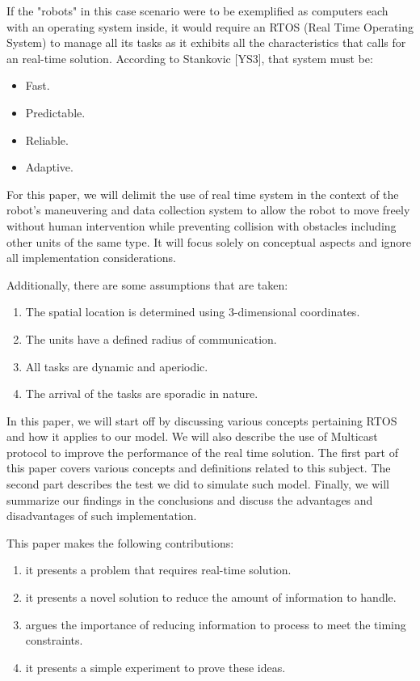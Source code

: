 \documentclass[journal]{IEEEtran}
\begin{document}
\begin{itemize}
If the "robots" in this case scenario were to be exemplified as computers each with an operating system inside, it would require an RTOS (Real Time Operating System) to manage all its tasks as it exhibits all the characteristics that calls for an real-time solution. According to Stankovic [YS3], that system must be:

\begin{itemize}
\item Fast.
\item Predictable.
\item Reliable.
\item Adaptive.
\end{itemize}

For this paper, we will delimit the use of real time system in the context of the robot's maneuvering and data collection system to allow the robot to move freely without human intervention while preventing collision with obstacles including other units of the same type. It will focus solely on conceptual aspects and ignore all implementation considerations. 

Additionally, there are some assumptions that are taken:

\begin{enumerate}
\item The spatial location is determined using 3-dimensional coordinates.
\item The units have a defined radius of communication.
\item All tasks are dynamic and aperiodic.
\item The arrival of the tasks are sporadic in nature.
\end{enumerate}

In this paper, we will start off by discussing various concepts pertaining RTOS and how it applies to our model. We will also describe the use of Multicast protocol to improve the performance of the real time solution. The first part of this paper covers various concepts and definitions related to this subject. The second part describes the test we did to simulate such model. Finally, we will summarize our findings in the conclusions and discuss the advantages and disadvantages of such implementation.

This paper makes the following contributions:
\begin{enumerate}
\item it presents a problem that requires real-time solution.
\item it presents a novel solution to reduce the amount of information to handle.
\item argues the importance of reducing information to process to meet the timing constraints.
\item it presents a simple experiment to prove these ideas.
\end{enumerate}



\end{itemize}
\end{document}
